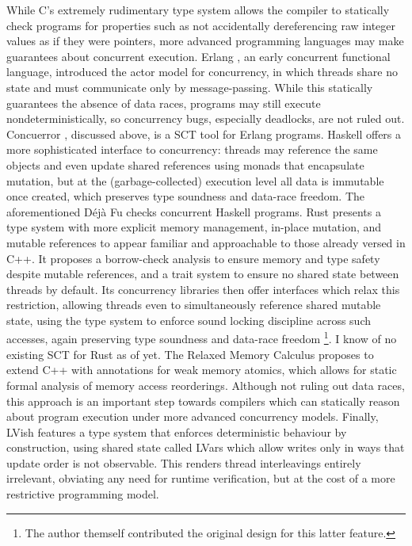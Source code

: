 While C's extremely rudimentary type system allows the compiler to statically check programs
for properties such as not accidentally dereferencing raw integer values as if they were pointers,
more advanced programming languages may make guarantees about concurrent execution.
%
Erlang \cite{erlang}, an early concurrent functional language,
introduced the actor model for concurrency,
in which threads share no state and must communicate only by message-passing.
While this statically guarantees the absence of data races,
programs may still execute nondeterministically,
so concurrency bugs, especially deadlocks, are not ruled out.
Concuerror \cite{concuerror}, discussed above, is a SCT tool for Erlang programs.
%
Haskell \cite{haskell} offers a more sophisticated interface to concurrency:
threads may reference the same objects and even update shared references
using monads that encapsulate mutation,
but at the (garbage-collected) execution level all data is immutable once created,
which preserves type soundness and data-race freedom.
The aforementioned D\'{e}j\`{a} Fu \cite{dejafu} checks concurrent Haskell programs.
%
Rust \cite{rust-language}
presents a type system with more explicit memory management,
in-place mutation,
and mutable references
to appear familiar and approachable to those already versed in C++.
It proposes a borrow-check analysis to ensure memory and type safety
despite mutable references,
and a trait system to ensure no shared state between threads by default.
Its concurrency libraries then offer interfaces which relax this restriction,
allowing threads even to simultaneously reference shared mutable state,
using the type system to enforce sound locking discipline across such accesses,
again preserving type soundness and data-race freedom%
\footnote{The author themself contributed the original design for this latter feature.}.
I know of no existing SCT for Rust as of yet.
%
The Relaxed Memory Calculus \cite{sully-thesis}
proposes to extend C++ with annotations for weak memory atomics,
which allows for static formal analysis of memory access reorderings.
Although not ruling out data races,
this approach is an important step towards compilers
which can statically reason about program execution under more advanced concurrency models.
%
Finally, LVish \cite{lvish}
features a type system that enforces deterministic behaviour by construction,
using shared state called LVars which allow writes only in ways that update order is not observable.
This renders thread interleavings entirely irrelevant,
obviating any need for runtime verification,
but at the cost of a more restrictive programming model.

